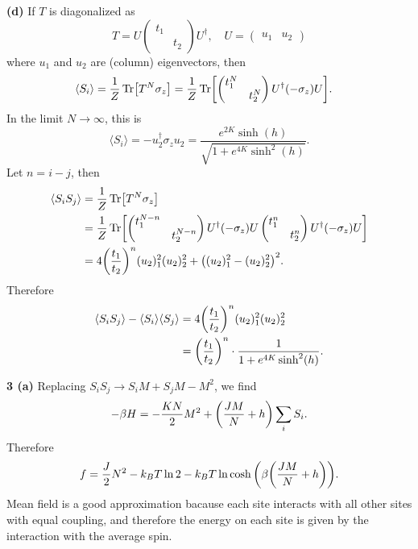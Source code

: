 \documentclass{article}
\makeatletter
\newcommand*{\shifttext}[1]{%
  \settowidth{\@tempdima}{#1}%
  \hspace{-\@tempdima}#1%
}
\newcommand{\plabel}[1]{%
\shifttext{\textbf{#1}\quad}%
}
\newcommand{\prule}{%
\begin{center}%
\hdashrule[0.5ex]{.99\linewidth}{1pt}{1pt 2.5pt}%
\end{center}%
}
\makeatother
\begin{document}
\plabel{(d)}%
If $T$ is diagonalized as
\[ T = U \begin{pmatrix}
    t_1 & \\ & t_2
\end{pmatrix} U^\dagger,\quad U = \begin{pmatrix}
    u_1 & u_2
\end{pmatrix} \]
where $u_1$ and $u_2$ are (column) eigenvectors,
then
\begin{align*}
    \langle S_i \rangle &= \frac{1}{Z}\Tr[T^N \sigma_z] = \frac{1}{Z}\Tr[\begin{pmatrix}
        t_1^N \\ & t_2^N
    \end{pmatrix}U^\dagger (-\sigma_z) U].
\end{align*}
In the limit $N\rightarrow \infty$, this is
\[ \langle S_i \rangle = -u_2^\dagger \sigma_z u_2 = \frac{e^{2 K } \sinh (h)}{\sqrt{1+e^{4 K } \sinh ^2(h)}}. \]
Let $n=i-j$, then
\begin{align*}
    \langle S_i S_j \rangle &= \frac{1}{Z}\Tr[T^N \sigma_z] \\
    &= \frac{1}{Z}\Tr[\begin{pmatrix}
        t_1^{N-n} \\ & t_2^{N-n}
    \end{pmatrix}U^\dagger (-\sigma_z) U\begin{pmatrix}
        t_1^{n} \\ & t_2^{n}
    \end{pmatrix}U^\dagger (-\sigma_z) U] \\
    &= 4 \qty(\frac{t_1}{t_2})^n (u_2)_1^2 (u_2)_2^2 + \qty((u_2)_1^2 - (u_2)_2^2)^2.
\end{align*}
Therefore
\begin{align*}
    \langle S_i S_j \rangle - \langle S_i \rangle \langle S_j \rangle &= 4 \qty(\frac{t_1}{t_2})^n (u_2)_1^2 (u_2)_2^2 \\
    &= \qty(\frac{t_1}{t_2})^n \cdot \frac{1}{1+e^{4K}\sinh^2(h)}.
\end{align*}

\prule

\plabel{3 (a)}%
Replacing $S_i S_j \rightarrow S_i M + S_j M - M^2$, we find
\[ -\beta H = -\frac{KN}{2}M^2 + \qty(\frac{JM}{N} + h)\sum_i S_i. \]
Therefore
\[ f = \frac{J}{2}N^2 - k_B T\ln 2 - k_B T \ln \cosh \qty(\beta\qty(\frac{JM}{N} + h)). \]
Mean field is a good approximation bacause each site interacts with all other sites with equal coupling, and therefore the energy on each site is given by the interaction with the average spin.
\end{document}
